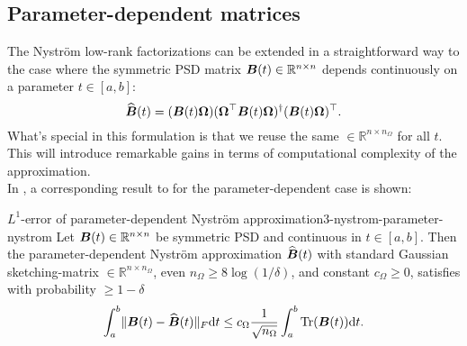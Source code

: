 \subsection{Parameter-dependent matrices}
\label{subsec:3-nystrom-factorization-parameter-matrices}

The Nystr\"om low-rank factorizations can be extended in a straightforward way
to the case where the symmetric \gls{PSD} matrix $\boldsymbol{B}(t) \in \mathbb{R}^{n \times n}$ depends
continuously on a parameter $t \in [a, b]$:
\begin{equation}
    \widehat{\boldsymbol{B}}(t) = (\boldsymbol{B}(t) \boldsymbol{\Omega}) (\boldsymbol{\Omega}^{\top} \boldsymbol{B}(t) \boldsymbol{\Omega})^{\dagger} (\boldsymbol{B}(t) \boldsymbol{\Omega})^{\top}.
    \label{equ:3-nystrom-nystrom-parameter}
\end{equation}
What's special in this formulation is that we reuse the same  $\in \mathbb{R}^{n \times n_{\Omega}}$
for all $t$. This will introduce remarkable gains in terms of computational
complexity of the approximation.\\

In \cite{he2023parameter}, a corresponding result to 
for the parameter-dependent case is shown:
\begin{lemma}{$L^1$-error of parameter-dependent Nystr\"om approximation}{3-nystrom-parameter-nystrom}
    Let $\boldsymbol{B}(t) \in \mathbb{R}^{n \times n}$ be symmetric \gls{PSD} and
    continuous in $t \in [a, b]$. Then the parameter-dependent Nystr\"om approximation
    $\widehat{\boldsymbol{B}}(t)$  with standard
    Gaussian \gls{sketching-matrix} $\in \mathbb{R}^{n \times n_{\Omega}}$,
    even $n_{\Omega} \geq 8 \log(1/\delta)$, and constant $c_{\Omega} \geq 0$,
    satisfies with probability $\geq 1 - \delta$
    \begin{equation}
        \int_{a}^{b} \lVert \boldsymbol{B}(t) - \widehat{\boldsymbol{B}}(t) \rVert _F \mathrm{d}t \leq c_{\Omega} \frac{1}{\sqrt{n_{\Omega}}} \int_{a}^{b} \operatorname{Tr}(\boldsymbol{B}(t)) \mathrm{d}t.
    \end{equation}
\end{lemma}

